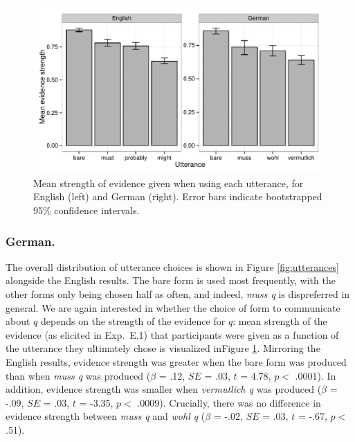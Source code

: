 \documentclass[11pt]{article}
\newcommand{\figref}[1]{Figure \ref{#1}}
\begin{document}
\begin{figure}
\centering
\includegraphics[width=.9\textwidth]{pics/mean-production-evidence}
\caption{Mean strength of evidence given when using each utterance, for English (left) and German (right). Error bars indicate bootstrapped 95\% confidence intervals.}
\label{fig:utterances-estrength}
\end{figure}


\subsubsection{German.} The overall distribution of utterance choices is shown in \figref{fig:utterances} alongside the English results. The bare form is used most frequently, with the other forms only being chosen half as often, and indeed, \emph{muss q} is dispreferred in general. We are again interested in whether the choice of form to communicate about $q$ depends on the strength of the evidence for $q$: mean strength of the evidence (as elicited in Exp.~E.1) that participants were given as a function of the utterance they ultimately chose is visualized in\figref{fig:utterances-estrength}.  Mirroring the English results, evidence strength was greater when the bare form was produced than when \emph{muss q} was produced ($\beta$ = .12, $SE$ = .03, $t$ = 4.78, $p <$ .0001). In addition, evidence strength was smaller when \emph{vermutlich q} was produced  ($\beta$ = -.09, $SE$ = .03, $t$ = -3.35, $p <$ .0009). Crucially, there was no difference in evidence strength between \emph{muss q} and \emph{wohl q}  ($\beta$ = -.02, $SE$ = .03, $t$ = -.67, $p <$ .51). 
\end{document}
